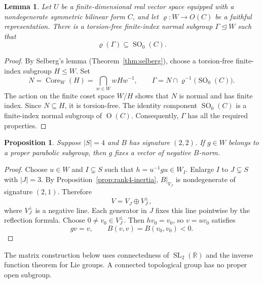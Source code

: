 \documentclass[11pt,reqno]{amsart}
\newcommand{\R}{\mathbb{R}}
\theoremstyle{plain}
\newtheorem{lemma}[theorem]{Lemma}
\newtheorem{proposition}[theorem]{Proposition}
\theoremstyle{definition}
\theoremstyle{remark}
\numberwithin{equation}{section}
\begin{document}
\begin{lemma}\label{lem:selberg-subgroup}
Let $U$ be a finite-dimensional real vector space equipped with
a nondegenerate symmetric bilinear form $C$, and let
$\varrho:W\to O(C)$ be a faithful representation. There is a torsion-free finite-index normal subgroup $\Gamma\trianglelefteq W$ such that
\[
\varrho(\Gamma)\subseteq\operatorname{SO}_0(C).
\]
\end{lemma}
\begin{proof}
By Selberg's lemma (Theorem~\ref{thm:selberg}), choose a torsion-free finite-index subgroup $H\leq W$. Set
\[
N=\operatorname{Core}_W(H)=\bigcap_{w\in W}wHw^{-1},\qquad
\Gamma=N\cap\varrho^{-1}\bigl(\operatorname{SO}_0(C)\bigr).
\]
The action on the finite coset space $W/H$ shows that $N$ is normal and has finite index. Since $N\subseteq H$, it is torsion-free. The identity component $\operatorname{SO}_0(C)$ is a finite-index normal subgroup of $\operatorname{O}(C)$. Consequently, $\Gamma$ has all the required properties.
\end{proof}

\begin{proposition}\label{prop:fixed-negative}
Suppose $|S|=4$ and $B$ has signature $(2,2)$. If $g\in W$ belongs to a proper parabolic subgroup, then $g$ fixes a vector of negative $B$-norm.
\end{proposition}
\begin{proof}
Choose $u\in W$ and $I\subsetneq S$ such that $h=u^{-1}gu\in W_I$. Enlarge $I$ to $J\subsetneq S$ with $|J|=3$. By Proposition~\ref{prop:rank4-inertia}, $B|_{V_J}$ is nondegenerate of signature $(2,1)$. Therefore
\[
V=V_J\oplus V_J^\perp,
\]
where $V_J^\perp$ is a negative line. Each generator in $J$ fixes this line pointwise by the reflection formula. Choose $0\neq v_0\in V_J^\perp$. Then $hv_0=v_0$, so $v=uv_0$ satisfies
\[
gv=v,\qquad B(v,v)=B(v_0,v_0)<0.
\]
\end{proof}

The matrix construction below uses connectedness of $\operatorname{SL}_2(\R)$ and the inverse function theorem for Lie groups. A connected topological group has no proper open subgroup.
\end{document}
